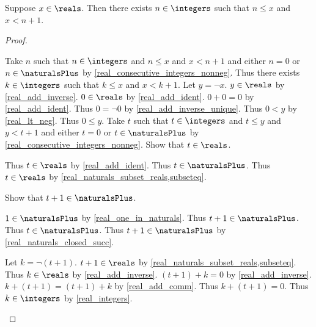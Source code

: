 \begin{theorem}\label{real_consecutive_integers}
    Suppose $x\in\reals$.
    Then there exists $n\in\integers$ such that $n \leq x$ and $x < n + 1$.
\end{theorem}
\begin{proof}
    \begin{byCase}
        Take $n$ such that $n\in\integers$ and $n \leq x$ and $x < n + 1$ and either $n = 0$ or $n\in\naturalsPlus$ by \cref{real_consecutive_integers_nonneg}.
        Thus there exists $k\in\integers$ such that $k \leq x$ and $x < k + 1$.
        Let $y = \neg{x}$.
        $y\in\reals$ by \cref{real_add_inverse}.
        $0\in\reals$ by \cref{real_add_ident}.
        $0 + 0 = 0$ by \cref{real_add_ident}.
        Thus $0 = \neg{0}$ by \cref{real_add_inverse_unique}.
        Thus $0 < y$ by \cref{real_lt_neg}.
        Thus $0 \leq y$.
        Take $t$ such that $t\in\integers$ and $t \leq y$ and $y < t + 1$ and either $t = 0$ or $t\in\naturalsPlus$ by \cref{real_consecutive_integers_nonneg}.
        Show that $t\in\reals$.
        \begin{subproof}
            \begin{byCase}
                Thus $t\in\reals$ by \cref{real_add_ident}.
                Thus $t\in\naturalsPlus$.
                Thus $t\in\reals$ by \cref{real_naturals_subset_reals,subseteq}.
            \end{byCase}
        \end{subproof}
        Show that $t + 1\in\naturalsPlus$.
        \begin{subproof}
            \begin{byCase}
                $1\in\naturalsPlus$ by \cref{real_one_in_naturals}.
                Thus $t + 1\in\naturalsPlus$.
                Thus $t\in\naturalsPlus$.
                Thus $t + 1\in\naturalsPlus$ by \cref{real_naturals_closed_succ}.
            \end{byCase}
        \end{subproof}
        Let $k = \neg{(t + 1)}$.
        $t + 1\in\reals$ by \cref{real_naturals_subset_reals,subseteq}.
        Thus $k\in\reals$ by \cref{real_add_inverse}.
        $(t + 1) + k = 0$ by \cref{real_add_inverse}.
        $k + (t + 1) = (t + 1) + k$ by \cref{real_add_comm}.
        Thus $k + (t + 1) = 0$.
        Thus $k\in\integers$ by \cref{real_integers}.

\end{byCase}
\end{proof}
